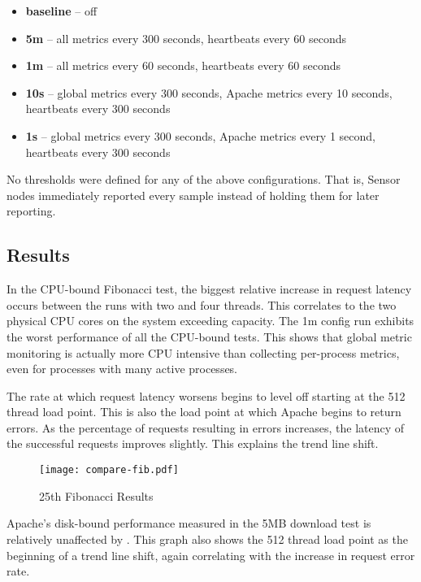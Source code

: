 \begin{itemize}
\item \textbf{baseline} -- \dcamp off
\item \textbf{5m} -- all metrics every 300 seconds, heartbeats every 60 seconds
\item \textbf{1m} -- all metrics every 60 seconds, heartbeats every 60 seconds
\item \textbf{10s} -- global metrics every 300 seconds, Apache metrics every 10 seconds, heartbeats every 300 seconds
\item \textbf{1s} -- global metrics every 300 seconds, Apache metrics every 1 second, heartbeats every 300 seconds
\end{itemize}

No thresholds were defined for any of the above configurations. That is, Sensor nodes immediately reported every sample
instead of holding them for later reporting.

\subsection{Results}

In the CPU-bound Fibonacci test, the biggest relative increase in request latency occurs between the runs with two and
four threads. This correlates to the two physical CPU cores on the system exceeding capacity. The 1m config run exhibits
the worst performance of all the CPU-bound tests. This shows that global metric monitoring is actually more CPU
intensive than collecting per-process metrics, even for processes with many active processes.

The rate at which request latency worsens begins to level off starting at the 512 thread load point. This is also the
load point at which Apache begins to return errors. As the percentage of requests resulting in errors increases, the
latency of the successful requests improves slightly. This explains the trend line shift.

\begin{figure}[H]
    \centering
    \vspace{-20pt}
    \texttt{[image: compare-fib.pdf]}
    \vspace{-50pt}
    \caption{25th Fibonacci Results}
    \label{fig:fib25_graph}
\end{figure}

Apache's disk-bound performance measured in the 5MB download test is relatively unaffected by \dcamp. This graph also
shows the 512 thread load point as the beginning of a trend line shift, again correlating with the increase in request
error rate.

